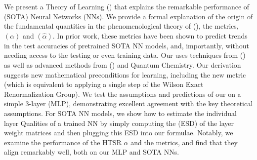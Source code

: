 We present a \SemiEmpirical Theory of Learning (\SETOL)
that explains the remarkable performance of \StateOfTheArt (SOTA) Neural Networks (NNs).
We provide a formal explanation of the origin of the
fundamental quantities in the phenomenological theory of  \HeavyTailedSelfRegularization (\HTSR), the 
\HeavyTailed \PowerLaw \LayerQuality metrics,
\ALPHAHAT $(\alpha)$ and \ALPHAHAT $(\hat{\alpha})$.
In prior work, these metrics have been shown to predict trends in the test accuracies of pretrained SOTA NN models,
and, importantly,  without needing access to the testing or even training data.
Our \SETOL
uses techniques from \StatisticalMechanics (\STATMECH) as well as advanced methods from \RandomMatrixTheory (\RMT) and Quantum Chemistry. Our derivation suggests new mathematical preconditions for \emph{\Ideal} learning, including the new \TRACELOG metric (which is equivalent to applying a single step of the Wilson Exact Renormalization Group).
We test the assumptions and predictions of our \SETOL on a simple 3-layer
\MultiLayer \Perceptron (MLP), demonstrating excellent agreement with the key theoretical assumptions. 
For SOTA NN models, we show how to estimate the individual layer Qualities of a trained NN by simply computing the \EmpiricalSpectralDensity (ESD) of the layer weight matrices and
then plugging this ESD into our \SETOL formulae.
Notably, we examine the performance of the HTSR $\alpha$ and the \SETOL \TRACELOG \LayerQuality metrics, and find that they align
remarkably well, both on our MLP and SOTA NNs.


